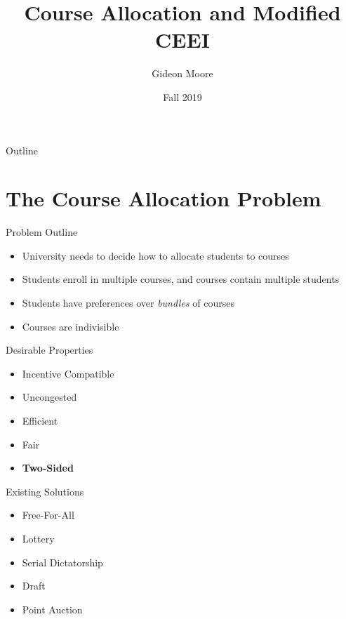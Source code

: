 \documentclass{beamer}
\title{Course Allocation and Modified CEEI}
\author{Gideon Moore}
\date{Fall 2019}
\begin{document}
\begin{frame}
\maketitle
\end{frame}
\begin{frame}{Outline}
\tableofcontents
\end{frame}
\section{The Course Allocation Problem}
\begin{frame}{Problem Outline}
\begin{itemize}
    \item University needs to decide how to allocate students to courses
    
    \item Students enroll in multiple courses, and courses contain multiple students
    
    \item Students have preferences over \emph{bundles} of courses
    
    \item Courses are indivisible
\end{itemize}
\end{frame}
\begin{frame}{Desirable Properties}
\begin{itemize}
    \item Incentive Compatible
    \pause
    \item Uncongested
    \pause
    \item Efficient
    \pause
    \item Fair
    \pause
    \item \textbf{Two-Sided}
\end{itemize}
\end{frame}
\begin{frame}{Existing Solutions}
\begin{itemize}
    \item Free-For-All
    \pause 
    \item Lottery 
    \pause 
    \item Serial Dictatorship \parencite{klaus2002}
    \pause 
    \item Draft \parencite{budish2012}
    \pause 
    \item Point Auction \parencite{sonmez2010}
\end{itemize}
\end{frame}
\end{document}
